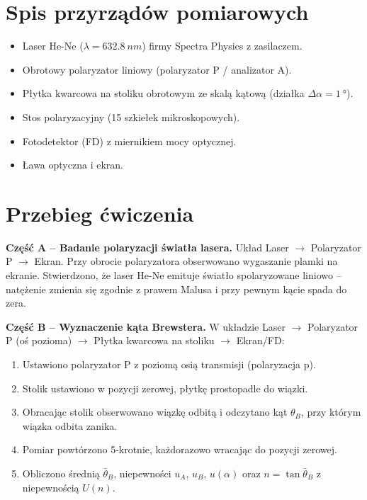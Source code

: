 \documentclass[a4paper,12pt]{article}
\begin{document}
\section*{Spis przyrządów pomiarowych}

\begin{itemize}
  \item Laser He-Ne ($\lambda = \SI{632,8}{nm}$) firmy Spectra Physics z zasilaczem.
  \item Obrotowy polaryzator liniowy (polaryzator P / analizator A).
  \item Płytka kwarcowa na stoliku obrotowym ze skalą kątową (działka $\Delta\alpha = \SI{1}{\degree}$).
  \item Stos polaryzacyjny (15 szkiełek mikroskopowych).
  \item Fotodetektor (FD) z miernikiem mocy optycznej.
  \item Ława optyczna i ekran.
\end{itemize}

\section*{Przebieg ćwiczenia}

\textbf{Część A -- Badanie polaryzacji światła lasera.}
Układ Laser $\to$ Polaryzator P $\to$ Ekran. Przy obrocie polaryzatora obserwowano
wygaszanie plamki na ekranie. Stwierdzono, że laser He-Ne emituje światło spolaryzowane
liniowo -- natężenie zmienia się zgodnie z prawem Malusa i przy pewnym kącie spada do zera.

\textbf{Część B -- Wyznaczenie kąta Brewstera.}
W układzie Laser $\to$ Polaryzator P (oś pozioma) $\to$ Płytka kwarcowa na stoliku $\to$
Ekran/FD:
\begin{enumerate}
  \item Ustawiono polaryzator P z poziomą osią transmisji (polaryzacja p).
  \item Stolik ustawiono w pozycji zerowej, płytkę prostopadle do wiązki.
  \item Obracając stolik obserwowano wiązkę odbitą i odczytano kąt $\theta_B$, przy
  którym wiązka odbita zanika.
  \item Pomiar powtórzono 5-krotnie, każdorazowo wracając do pozycji zerowej.
  \item Obliczono średnią $\bar{\theta}_B$, niepewności $u_A$, $u_B$, $u(\alpha)$
  oraz $n = \tan\bar{\theta}_B$ z niepewnością $U(n)$.
\end{enumerate}
\end{document}
